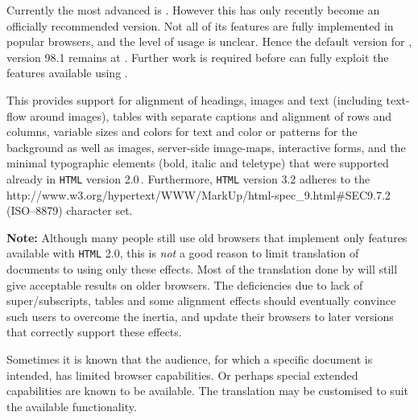 Currently the most advanced is \HTMLIV. 
However this has only recently become an officially recommended version.
Not all of its features are fully implemented in popular browsers,
and the level of usage is unclear.
Hence the default version for \latextohtml, version 98.1 remains at \HTMLIII.
Further work is required before \latextohtml{} can fully exploit the
features available using \HTMLIV.

%
%
%
%
%
This provides support for alignment of headings, images and text
(including text-flow around images), tables with separate captions
and alignment of rows and columns, variable sizes and colors for
text and color or patterns for the background
as well as images, server-side image-maps, interactive forms, 
and the minimal typographic elements (bold, italic and teletype)
that were supported already in \texttt{HTML} version 2.0\,.
Furthermore, \texttt{HTML} version 3.2 
adheres to the %
{http://www.w3.org/hypertext/WWW/MarkUp/html-spec_9.html\#SEC9.7.2}
(ISO--8879) character set.

\medskip\noindent
\textbf{Note: }Although many people still use old browsers 
that implement only features available with \texttt{HTML} 2.0, 
this is \emph{not} a good reason to limit translation of documents 
to using only these effects. Most of the translation done by \latextohtml{} 
will still give acceptable results on older browsers. 
The deficiencies due to lack of super/subscripts, tables 
and some alignment effects should eventually convince such users 
to overcome the inertia, and update their browsers to later versions that
correctly support these effects.

\medskip\noindent
Sometimes it is known that the audience, for which a specific document 
is intended, has limited browser capabilities. 
Or perhaps special extended capabilities are known to be available.
The \latextohtml{} translation may be customised to suit the
available functionality.

